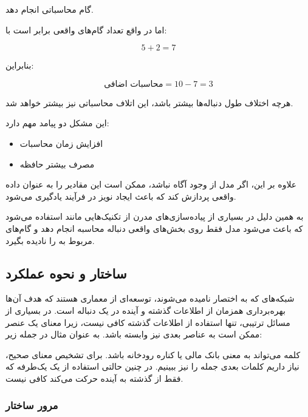\documentclass{article}
\begin{document}
گام محاسباتی انجام دهد.

اما در واقع تعداد گام‌های واقعی برابر است با:

\begin{equation}
	5 + 2 = 7
\end{equation}

بنابراین:

\begin{equation}
	\text{محاسبات اضافی} = 10 - 7 = 3
\end{equation}

هرچه اختلاف طول دنباله‌ها بیشتر باشد، این اتلاف محاسباتی نیز بیشتر خواهد شد.

این مشکل دو پیامد مهم دارد:

\begin{itemize}
	\item افزایش زمان محاسبات
	\item مصرف بیشتر حافظه
\end{itemize}

علاوه بر این، اگر مدل از وجود  آگاه نباشد، ممکن است این مقادیر را به عنوان داده واقعی پردازش کند که باعث ایجاد نویز در فرآیند یادگیری می‌شود.

به همین دلیل در بسیاری از پیاده‌سازی‌های مدرن از تکنیک‌هایی مانند  استفاده می‌شود که باعث می‌شود مدل فقط روی بخش‌های واقعی دنباله محاسبه انجام دهد و گام‌های مربوط به  را نادیده بگیرد.
\subsection{ساختار و نحوه عملکرد }

شبکه‌های  که به اختصار  نامیده می‌شوند، توسعه‌ای از معماری  هستند که هدف آن‌ها بهره‌برداری همزمان از اطلاعات گذشته و آینده در یک دنباله است. 
در بسیاری از مسائل ترتیبی، تنها استفاده از اطلاعات گذشته کافی نیست، زیرا معنای یک عنصر ممکن است به عناصر بعدی نیز وابسته باشد. 
به عنوان مثال در جمله زیر:

\begin{center}
\end{center}

کلمه  می‌تواند به معنی بانک مالی یا کناره رودخانه باشد. 
برای تشخیص معنای صحیح، نیاز داریم کلمات بعدی جمله را نیز ببینیم. 
در چنین حالتی استفاده از یک  یک‌طرفه که فقط از گذشته به آینده حرکت می‌کند کافی نیست.

\subsubsection{مرور ساختار }
\end{document}
